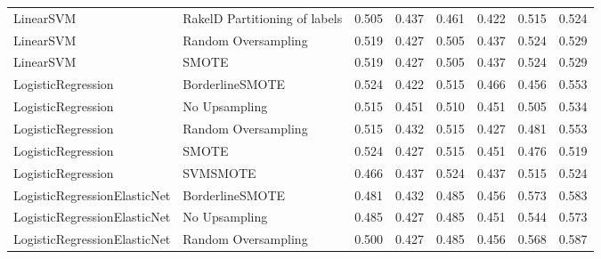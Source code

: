 \begin{tabular}{llllllll}
                      LinearSVM & RakelD Partitioning of labels & 0.505 &                     0.437 &                 0.461 &                  0.422 &                                   0.515 &     0.524 \\
                      LinearSVM &           Random Oversampling & 0.519 &                     0.427 &                 0.505 &                  0.437 &                                   0.524 &     0.529 \\
                      LinearSVM &                         SMOTE & 0.519 &                     0.427 &                 0.505 &                  0.437 &                                   0.524 &     0.529 \\
             LogisticRegression &               BorderlineSMOTE & 0.524 &                     0.422 &                 0.515 &                  0.466 &                                   0.456 &     0.553 \\
             LogisticRegression &                 No Upsampling & 0.515 &                     0.451 &                 0.510 &                  0.451 &                                   0.505 &     0.534 \\
             LogisticRegression &           Random Oversampling & 0.515 &                     0.432 &                 0.515 &                  0.427 &                                   0.481 &     0.553 \\
             LogisticRegression &                         SMOTE & 0.524 &                     0.427 &                 0.515 &                  0.451 &                                   0.476 &     0.519 \\
             LogisticRegression &                      SVMSMOTE & 0.466 &                     0.437 &                 0.524 &                  0.437 &                                   0.515 &     0.524 \\
   LogisticRegressionElasticNet &               BorderlineSMOTE & 0.481 &                     0.432 &                 0.485 &                  0.456 &                                   0.573 &     0.583 \\
   LogisticRegressionElasticNet &                 No Upsampling & 0.485 &                     0.427 &                 0.485 &                  0.451 &                                   0.544 &     0.573 \\
   LogisticRegressionElasticNet &           Random Oversampling & 0.500 &                     0.427 &                 0.485 &                  0.456 &                                   0.568 &     0.587 \\

\end{tabular}

